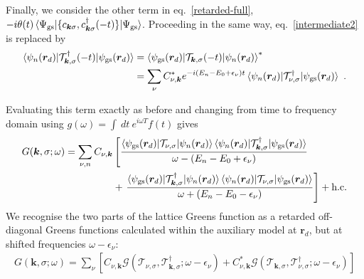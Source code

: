 Finally, we consider the other term in eq.~\ref{retarded-full}, \(-i\theta(t) \braket{\Psi_\text{gs} | \{c_{{\bm k}\sigma}, c^\dagger_{{\bm k}\sigma}(-t)\} | \Psi_\text{gs}}\). Proceeding in the same way, eq.~\ref{intermediate2} is replaced by
\begin{equation}\begin{aligned}
	\braket{\psi_{n}({\bm r_d}) | \mathcal{T}^\dagger_{{\bm k},\sigma}(-t) | \psi_\text{gs}({\bm r_d})} &= \braket{\psi_\text{gs}({\bm r_d}) | \mathcal{T}_{{\bm k},\sigma}(-t) | \psi_{n}({\bm r_d})}^* \\
																										&= \sum_{\nu}C^*_{\nu,\bm k}e^{-i(E_n - E_0 + \epsilon_\nu)t} \braket{\psi_{n}({\bm r_d}) | \mathcal{T}^\dagger_{{\nu},\sigma} | \psi_\text{gs}({\bm r_d})}~.
\end{aligned}\end{equation}

Evaluating this term exactly as before and changing from time to frequency domain using \(g(\omega) = \int~dt~ e^{i\omega T}f(t)\) gives
\begin{equation}\begin{aligned}
	G(\bm k,\sigma;\omega) =  \sum_{\nu, n} C_{\nu,\bm k} &\left[\frac{\braket{\psi_\text{gs}({\bm r_d}) | \mathcal{T}_{\nu,\sigma} | \psi_{n}({\bm r_d})}\braket{\psi_n({\bm r_d}) | \mathcal{T}_{\bm k,\sigma}^\dagger | \psi_\text{gs}({\bm r_d})}}{\omega - (E_n - E_0 + \epsilon_\nu)}\right.\\
														  &+ \left.\frac{\braket{\psi_\text{gs}({\bm r_d}) | \mathcal{T}^\dagger_{\bm k,\sigma} | \psi_{n}({\bm r_d})}\braket{\psi_n({\bm r_d}) | \mathcal{T}_{\nu,\sigma} | \psi_\text{gs}({\bm r_d})}}{\omega + (E_n - E_0 - \epsilon_\nu)}\right] + \text{h.c.}
\end{aligned}\end{equation}
We recognise the two parts of the lattice Greens function as a retarded off-diagonal Greens functions calculated within the auxiliary model at \(\bm r_d\), but at shifted frequencies \(\omega - \epsilon_\nu\):
\begin{equation}\begin{aligned}
	G(\bm k,\sigma;\omega) = \sum_\nu \left[C_{\nu,\bm k} \mathcal{G}(\mathcal{T}_{\nu,\sigma}, \mathcal{T}^\dagger_{\bm k,\sigma}; \omega - \epsilon_{\nu}) + C^*_{\nu,\bm k} \mathcal{G}(\mathcal{T}_{\bm k,\sigma}, \mathcal{T}^\dagger_{\nu,\sigma}; \omega - \epsilon_{\nu})\right]
\end{aligned}\end{equation}

